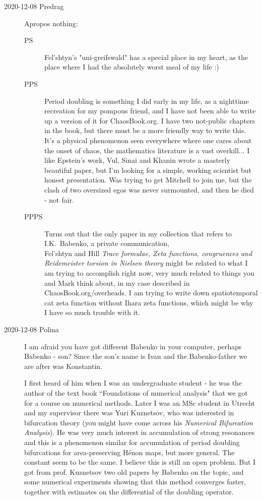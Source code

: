\begin{description}
\item[2020-12-08 Predrag] Apropos nothing:
\begin{description}
  \item[PS]
Fel{'s}htyn's "uni-greifswald" has a special place in my
heart, as the place where I had the absolutely
{worst meal of my life} :)
  \item[PPS]
Period doubling is something I did early in my life, as a nighttime
recreation for my pompous friend, and I have not been able to write up a
version of it for ChaosBook.org. I have two not-public chapters in the
book, but there must be a more friendly way to write this. It's a
physical phenomenon seen everywhere where one cares about the onset of
chaos, the mathematics literature is a vast overkill... I like Epstein's
work, Vul, Sinai and Khanin
wrote a masterly beautiful paper, but I'm looking for a simple, working
scientist but honest presentation. Was trying to get Mitchell to join me,
but the clash of two oversized egos was never surmounted, and then he
died - not fair.
  \item[PPPS]
Turns out that the only paper in my collection that refers to I.K.~Babenko,
a private communication, \\
Fel{'s}htyn and Hill {\em Trace formulae, {Zeta}
functions, congruences and {Reidemeister} torsion in {Nielsen} theory}
 might be related to what I am trying to
accomplish right now, very much related to things you and Mark think
about, in my case described in
{ChaosBook.org/overheads}. I am trying to write down spatiotemporal cat
zeta function without Ihara zeta functions, which might be why I have so
much trouble with it.
\end{description}

\item[2020-12-08 Polina]
I am afraid you have got different Babenko in your computer, perhaps
Babenko - 
{son}? Since the son's name is Ivan and the Babenko-father we are after
was Konstantin.

I first heard of him when I was an undergraduate student - he was the
author of the text book ``Foundations of numerical analysis" that we got
for a course on numerical methods. Later I was an MSc student in Utrecht
and my supervisor there was Yuri Kuznetsov, who was interested in
bifurcation theory (you might have come across his {\em
Numerical Bifurcation Analysis}). He was very much interest in
accumulation of strong resonances and this is a phenomenon similar for
accumulation of period doubling bifurcations for area-preserving H\'enon
maps, but more general. The constant seem to be the same. I believe this
is still an open problem. But I got from prof. Kuznetsov two old papers
by Babenko on the topic, and some numerical experiments showing that this
method converges faster, together with estimates on the differential of
the doubling operator.




\end{description}
